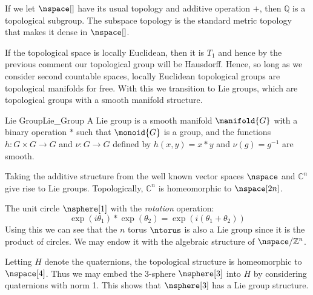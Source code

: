 \documentclass{book}                                                           %
\begin{document}
            \begin{example}
                If we let $\nspace[]$ have its usual topology and additive
                operation $+$, then $\mathbb{Q}$ is a topological subgroup. The
                subspace topology is the standard metric topology that makes it
                dense in $\nspace[]$.
            \end{example}
            If the topological space is locally Euclidean, then it is $T_{1}$
            and hence by the previous comment our topological group will be
            Hausdorff. Hence, so long as we consider second countable spaces,
            locally Euclidean topological groups are topological manifolds for
            free. With this we transition to Lie groups, which are topological
            groups with a smooth manifold structure.
            \begin{fdefinition}{Lie Group}{Lie_Group}
                A Lie group is a smooth manifold $\manifold{G}$ with a binary
                operation $*$ such that $\monoid{G}$ is a group, and the
                functions $h:G\times{G}\rightarrow{G}$ and $\nu:G\rightarrow{G}$
                defined by $h(x,y)=x*y$ and $\nu(g)=g^{\minus{1}}$ are smooth.
            \end{fdefinition}
            \begin{example}
                Taking the additive structure from the well known vector spaces
                $\nspace$ and $\mathbb{C}^{n}$ give rise to Lie groups.
                Topologically, $\mathbb{C}^{n}$ is homeomorphic to
                $\nspace[2n]$.
            \end{example}
            \begin{example}
                The unit circle $\nsphere[1]$ with the \textit{rotation}
                operation:
                \begin{equation}
                    \exp(i\theta_{1})*\exp(\theta_{2})
                        =\exp(i(\theta_{1}+\theta_{2}))
                \end{equation}
                Using this we can see that the $n$ torus $\ntorus$ is also a
                Lie group since it is the product of circles. We may endow it
                with the algebraic structure of $\nspace/\mathbb{Z}^{n}$.
            \end{example}
            \begin{example}
                Letting $H$ denote the quaternions, the topological structure is
                homeomorphic to $\nspace[4]$. Thus we may embed the 3-sphere
                $\nsphere[3]$ into $H$ by considering quaternions with norm 1.
                This shows that $\nsphere[3]$ has a Lie group structure.
            \end{example}
\end{document}
